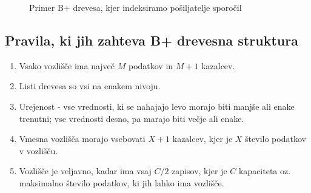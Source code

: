 \documentclass[a4paper,12pt,openright]{book}
\begin{document}
        \begin{figure}[h]
        
\begin{center}
\end{center}

            \caption{Primer B+ drevesa, kjer indeksiramo pošiljatelje sporočil}
            \label{sl:mindmap}
        \end{figure}

        

        \newpage
        \subsection{Pravila, ki jih zahteva B+ drevesna struktura}
        \begin{enumerate}
            \item Vsako vozlišče ima največ $M$ podatkov in $M+1$ kazalcev.
            \item Listi drevesa so vsi na enakem nivoju.
            \item Urejenost - vse vrednosti, ki se nahajajo levo morajo biti manjše ali enake trenutni; vse vrednosti desno, pa marajo biti večje ali enake.
            \item Vmesna vozlišča morajo vsebovati $X+1$ kazalcev, kjer je $X$ število podatkov v vozlišču.
            \item Vozlišče je veljavno, kadar ima vsaj $C/2$ zapisov, kjer je $C$ kapaciteta oz. maksimalno število podatkov, ki jih lahko ima vozlišče.
        \end{enumerate}
\end{document}
